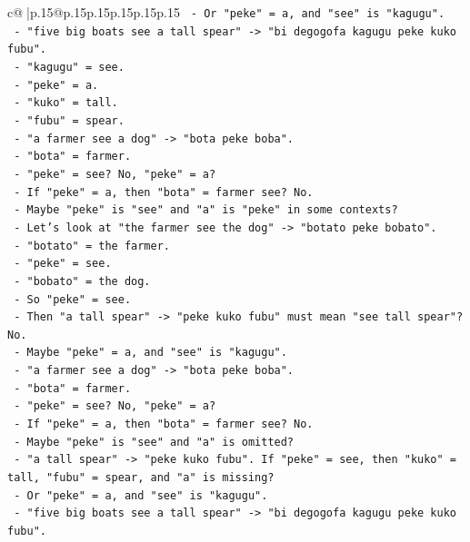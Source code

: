 \documentclass{article}
\begin{document}
{\begin{supertabular}{c@{$\;$}|p{.15\linewidth}@{}p{.15\linewidth}p{.15\linewidth}p{.15\linewidth}p{.15\linewidth}p{.15\linewidth}}
{{{\texttt{        {-} Or "peke" = a, and "see" is "kagugu".} \\
\texttt{        {-} "five big boats see a tall spear" {-}> "bi degogofa kagugu peke kuko fubu".} \\
\texttt{        {-} "kagugu" = see.} \\
\texttt{        {-} "peke" = a.} \\
\texttt{        {-} "kuko" = tall.} \\
\texttt{        {-} "fubu" = spear.} \\
\texttt{        {-} "a farmer see a dog" {-}> "bota peke boba".} \\
\texttt{        {-} "bota" = farmer.} \\
\texttt{        {-} "peke" = see? No, "peke" = a?} \\
\texttt{        {-} If "peke" = a, then "bota" = farmer see? No.} \\
\texttt{        {-} Maybe "peke" is "see" and "a" is "peke" in some contexts?} \\
\texttt{        {-} Let's look at "the farmer see the dog" {-}> "botato peke bobato".} \\
\texttt{        {-} "botato" = the farmer.} \\
\texttt{        {-} "peke" = see.} \\
\texttt{        {-} "bobato" = the dog.} \\
\texttt{        {-} So "peke" = see.} \\
\texttt{        {-} Then "a tall spear" {-}> "peke kuko fubu" must mean "see tall spear"? No.} \\
\texttt{        {-} Maybe "peke" = a, and "see" is "kagugu".} \\
\texttt{        {-} "a farmer see a dog" {-}> "bota peke boba".} \\
\texttt{        {-} "bota" = farmer.} \\
\texttt{        {-} "peke" = see? No, "peke" = a?} \\
\texttt{        {-} If "peke" = a, then "bota" = farmer see? No.} \\
\texttt{        {-} Maybe "peke" is "see" and "a" is omitted?} \\
\texttt{        {-} "a tall spear" {-}> "peke kuko fubu". If "peke" = see, then "kuko" = tall, "fubu" = spear, and "a" is missing?} \\
\texttt{        {-} Or "peke" = a, and "see" is "kagugu".} \\
\texttt{        {-} "five big boats see a tall spear" {-}> "bi degogofa kagugu peke kuko fubu".} \\
}}}
\end{supertabular}}
\end{document}
